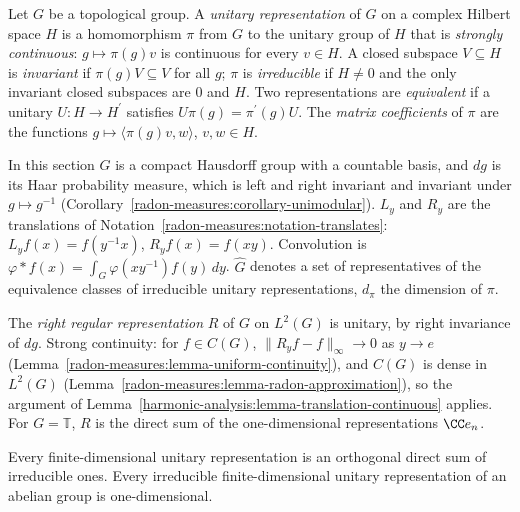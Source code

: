 \begin{definition}\label{harmonic-analysis:definition-unitary-representation}
Let $G$ be a topological group. A \emph{unitary representation} of $G$ on a complex Hilbert space $H$ is a homomorphism $\pi$ from $G$ to the unitary group of $H$ that is \emph{strongly continuous}: $g \mapsto \pi(g)v$ is
continuous for every $v \in H$. A closed subspace $V \subseteq H$ is \emph{invariant} if $\pi(g)V \subseteq V$ for all $g$; $\pi$ is \emph{irreducible} if $H \neq 0$ and the only invariant closed subspaces are $0$ and $H$. Two
representations are \emph{equivalent} if a unitary $U \colon H \to H^{\prime}$ satisfies $U\pi(g) = \pi^{\prime}(g)U$. The \emph{matrix coefficients} of $\pi$ are the functions $g \mapsto \langle\pi(g)v, w\rangle$, $v, w \in H$.
\end{definition}

\begin{notation}\label{harmonic-analysis:notation-compact-group}
In this section $G$ is a compact Hausdorff group with a countable basis, and $dg$ is its Haar probability measure, which is left and right invariant and invariant under $g \mapsto g^{-1}$
(Corollary~\ref{radon-measures:corollary-unimodular}). $L_y$ and $R_y$ are the translations of Notation~\ref{radon-measures:notation-translates}: $L_yf(x) = f(y^{-1}x)$, $R_yf(x) = f(xy)$. Convolution is
$\varphi * f(x) = \int_G\varphi(xy^{-1})f(y)\,dy$. $\widehat G$ denotes a set of representatives of the equivalence classes of irreducible unitary representations, $d_\pi$ the dimension of $\pi$.
\end{notation}

\begin{example}\label{harmonic-analysis:example-regular-representation}
The \emph{right regular representation} $R$ of $G$ on $L^2(G)$ is unitary, by right invariance of $dg$. Strong continuity: for $f \in C(G)$, $\|R_yf - f\|_\infty \to 0$ as $y \to e$
(Lemma~\ref{radon-measures:lemma-uniform-continuity}), and $C(G)$ is dense in $L^2(G)$ (Lemma~\ref{radon-measures:lemma-radon-approximation}), so the argument of Lemma~\ref{harmonic-analysis:lemma-translation-continuous} applies. For
$G = \mathbb{T}$, $R$ is the direct sum of the one-dimensional representations $\CC e_n$.
\end{example}

\begin{lemma}\label{harmonic-analysis:lemma-complete-reducibility}
Every finite-dimensional unitary representation is an orthogonal direct sum of irreducible ones. Every irreducible finite-dimensional unitary representation of an abelian group is one-dimensional.
\end{lemma}

